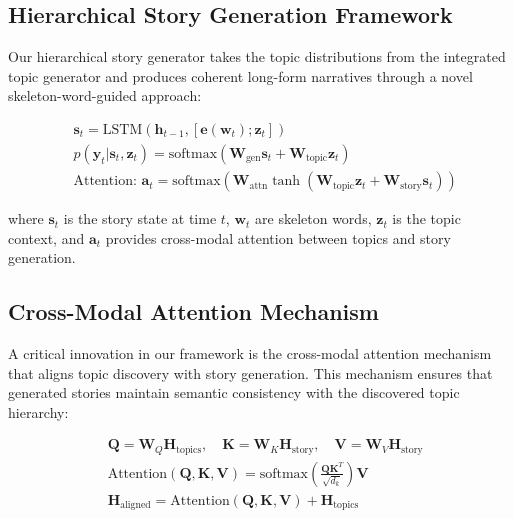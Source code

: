 \documentclass{article}
\begin{document}
\subsection{Hierarchical Story Generation Framework}

Our hierarchical story generator takes the topic distributions from the integrated topic generator and produces coherent long-form narratives through a novel skeleton-word-guided approach:

\begin{equation} \label{story_generation}
\begin{split}
& \bm{s}_t = \text{LSTM}(\bm{h}_{t-1}, [\bm{e}(\bm{w}_t); \bm{z}_t]) \\
& p(\bm{y}_t|\bm{s}_t, \bm{z}_t) = \text{softmax}(\bm{W}_{\text{gen}} \bm{s}_t + \bm{W}_{\text{topic}} \bm{z}_t) \\
& \text{Attention: } \bm{a}_t = \text{softmax}(\bm{W}_{\text{attn}} \tanh(\bm{W}_{\text{topic}} \bm{z}_t + \bm{W}_{\text{story}} \bm{s}_t))
\end{split}
\end{equation}

where $\bm{s}_t$ is the story state at time $t$, $\bm{w}_t$ are skeleton words, $\bm{z}_t$ is the topic context, and $\bm{a}_t$ provides cross-modal attention between topics and story generation.

\subsection{Cross-Modal Attention Mechanism}

A critical innovation in our framework is the cross-modal attention mechanism that aligns topic discovery with story generation. This mechanism ensures that generated stories maintain semantic consistency with the discovered topic hierarchy:

\begin{equation} \label{cross_modal_attention}
\begin{split}
& \bm{Q} = \bm{W}_Q \bm{H}_{\text{topics}}, \quad \bm{K} = \bm{W}_K \bm{H}_{\text{story}}, \quad \bm{V} = \bm{W}_V \bm{H}_{\text{story}} \\
& \text{Attention}(\bm{Q}, \bm{K}, \bm{V}) = \text{softmax}\left(\frac{\bm{Q}\bm{K}^T}{\sqrt{d_k}}\right) \bm{V} \\
& \bm{H}_{\text{aligned}} = \text{Attention}(\bm{Q}, \bm{K}, \bm{V}) + \bm{H}_{\text{topics}}
\end{split}
\end{equation}
\end{document}
